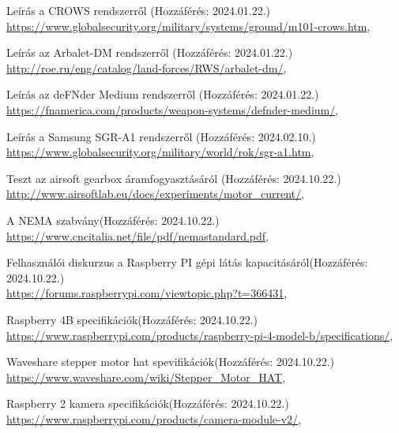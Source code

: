 \documentclass[12pt,a4paper]{article}
\begin{document}
\pagebreak
	\begin{thebibliography}{}
	Leírás a CROWS rendszerről \hfill (Hozzáférés: 2024.01.22.) \\
	{\footnotesize \url{https://www.globalsecurity.org/military/systems/ground/m101-crows.htm}},
	
	Leírás az Arbalet-DM rendszerről \hfill (Hozzáférés: 2024.01.22.) \\
	{\footnotesize \url{http://roe.ru/eng/catalog/land-forces/RWS/arbalet-dm/}},
	
	Leírás az deFNder Medium rendszerről \hfill (Hozzáférés: 2024.01.22.) \\
	{\footnotesize \url{https://fnamerica.com/products/weapon-systems/defnder-medium/}},
	
	Leírás a Samsung SGR-A1 rendszerről \hfill (Hozzáférés: 2024.02.10.) \\
	{\footnotesize \url{https://www.globalsecurity.org/military/world/rok/sgr-a1.htm}},
	
	Teszt az airsoft gearbox áramfogyasztásáról \hfill (Hozzáférés: 2024.10.22.) \\
	{\footnotesize \url{http://www.airsoftlab.eu/docs/experiments/motor_current/}},
	
	A NEMA szabvány\hfill (Hozzáférés: 2024.10.22.) \\
	{\footnotesize \url{https://www.cncitalia.net/file/pdf/nemastandard.pdf}},
	
	Felhasználói diskurzus a Raspberry PI gépi látás kapacitásáról\hfill (Hozzáférés: 2024.10.22.) \\
	{\footnotesize \url{https://forums.raspberrypi.com/viewtopic.php?t=366431}},
	
	Raspberry 4B specifikációk\hfill (Hozzáférés: 2024.10.22.) \\
	{\footnotesize \url{https://www.raspberrypi.com/products/raspberry-pi-4-model-b/specifications/}},
	
	Waveshare stepper motor hat spevifikációk\hfill (Hozzáférés: 2024.10.22.) \\
	{\footnotesize \url{https://www.waveshare.com/wiki/Stepper_Motor_HAT}},

	Raspberry 2 kamera specifikációk\hfill (Hozzáférés: 2024.10.22.) \\
	{\footnotesize \url{https://www.raspberrypi.com/products/camera-module-v2/}},

\end{thebibliography}
\end{document}
